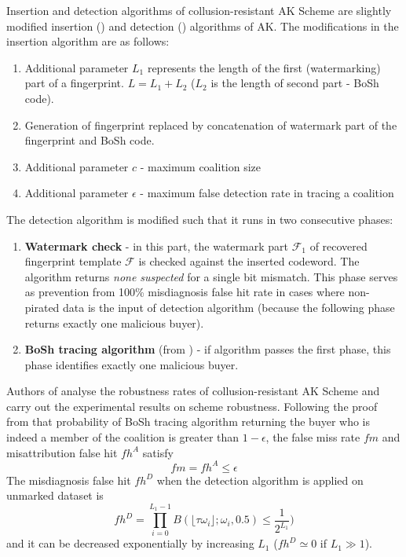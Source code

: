 Insertion and detection algorithms of collusion-resistant AK Scheme are slightly modified insertion () and detection () algorithms of AK. 
The modifications in the insertion algorithm are as follows:
\begin{enumerate}
    \item Additional parameter $L_1$ represents the length of the first (watermarking) part of a fingerprint. $L=L_1+L_2$ ($L_2$ is the length of second part - BoSh code).
    \item Generation of fingerprint replaced by concatenation of watermark part of the fingerprint and BoSh code.
    \item Additional parameter $c$ - maximum coalition size
    \item Additional parameter $\epsilon$ - maximum false detection rate in tracing a coalition
\end{enumerate}
The detection algorithm is modified such that it runs in two consecutive phases:
\begin{enumerate}
    \item \textbf{Watermark check} - in this part, the watermark part $\mathcal{F_1}$ of recovered fingerprint template $\mathcal{F}$ is checked against the inserted codeword. The algorithm returns \textit{none suspected} for a single bit mismatch. This phase serves as prevention from 100\% misdiagnosis false hit rate in cases where non-pirated data is the input of detection algorithm (because the following phase returns exactly one malicious buyer). 
    \item \textbf{BoSh tracing algorithm} (from \cite{boneh1998collusion}) - if algorithm passes the first phase, this phase identifies exactly one malicious buyer.
\end{enumerate}

Authors of \cite{li2005fingerprinting} analyse the robustness rates of collusion-resistant AK Scheme and carry out the experimental results on scheme robustness.
Following the proof from \cite{boneh1998collusion} that probability of BoSh tracing algorithm returning the buyer who is indeed a member of the coalition is greater than $1-\epsilon$, the false miss rate $fm$ and misattribution false hit $fh^A$ satisfy
\begin{equation}
    fm=fh^A \leq \epsilon
\end{equation}
The misdiagnosis false hit $fh^D$ when the detection algorithm is applied on unmarked dataset is
\begin{equation}
    fh^D=\prod_{i=0}^{L_1-1}B(\lfloor\tau\omega_i\rfloor;\omega_i,0.5)\leq \frac{1}{2^{L_1}})
\end{equation}
and it can be decreased exponentially by increasing $L_1$ ($fh^D \simeq0$ if $L_1 \gg 1$).
